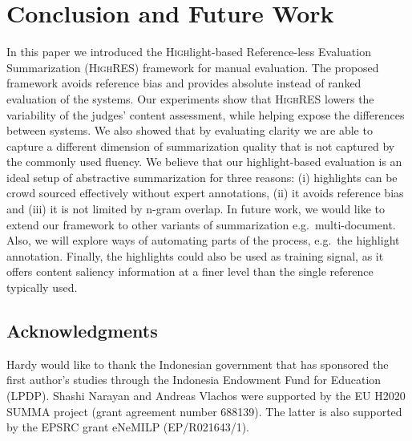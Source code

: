 \documentclass[11pt,a4paper]{article}
\newcommand\shashi[1]{{\textcolor{blue}{shashi: #1}}}
\newcommand\highres{\textsc{HighRES}}
\begin{document}
\section{Conclusion and Future Work}
In this paper we introduced the \textsc{High}light-based \textsc{R}eference-less \textsc{E}valuation \textsc{S}ummarization (\highres) framework for manual evaluation.
The proposed framework avoids reference  bias
and provides absolute instead of ranked evaluation of the systems. Our experiments show that \highres{}  lowers the variability of the judges' content assessment, while helping expose the differences between systems. We also showed that by evaluating clarity we are able to capture a different dimension of summarization quality that is not captured by the commonly used fluency. 
We believe that our highlight-based evaluation is an ideal setup of abstractive summarization for three reasons: (i) highlights can be crowd sourced effectively without expert annotations, (ii) it avoids reference bias and (iii) it is not limited by n-gram overlap.
In future work, we would like to extend our framework to other variants of summarization e.g.\  multi-document. Also, we will explore ways of automating parts of the process, e.g.\ the highlight annotation. Finally, the highlights could also be used as training signal, as it offers content saliency information at a finer level than the single reference typically used.

\begin{footnotesize}

\section*{Acknowledgments}

Hardy would like to thank the Indonesian government that
has sponsored the first author’s studies through
the Indonesia Endowment Fund for Education
(LPDP). Shashi Narayan and Andreas Vlachos were supported by the
EU H2020 SUMMA project (grant agreement
number 688139). The latter is also supported by the EPSRC grant eNeMILP
(EP/R021643/1).


\end{footnotesize}



\end{document}
